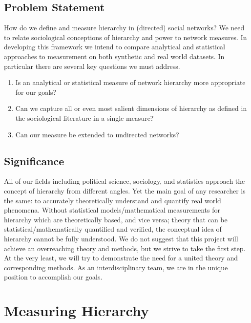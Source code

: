 \documentclass[3p,times]{elsarticle}
\begin{document}
\subsection{Problem Statement}
\begin{flushleft}
	How do we define and measure hierarchy in (directed) social networks? We need to relate sociological conceptions of hierarchy and power to network measures. In developing this framework we intend to compare analytical and statistical approaches to measurement on both synthetic and real world datasets. In particular there are several key questions we must address.	
\end{flushleft}
\begin{enumerate}
	\item Is an analytical or statistical measure of network hierarchy more appropriate for our  goals?  
	\item Can we capture all or even most salient dimensions of hierarchy as defined in the sociological literature in a single measure?
	\item Can our measure be extended to undirected networks?
\end{enumerate}

\subsection{Significance}
\begin{flushleft}
	All of our fields including political science, sociology, and statistics approach the concept of hierarchy from different angles. Yet the main goal of any researcher is the same:  to accurately theoretically understand and quantify real world phenomena. Without statistical models/mathematical measurements for hierarchy which are theoretically based, and vice versa; theory that can be statistical/mathematically quantified and verified, the conceptual idea of hierarchy cannot be fully understood. We do not suggest that this project will achieve an overreaching theory and methods, but we strive to take the first step. At the very least, we will try to demonstrate the need for a united theory and corresponding methods. As an interdisciplinary team, we are in the unique position to accomplish our goals.
\end{flushleft}

\section{Measuring Hierarchy}
\end{document}
